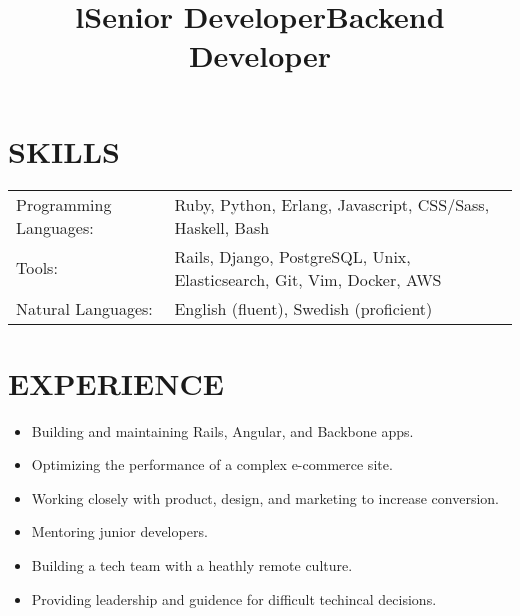 \documentclass[line]{res}
\title{l}\dates{r}\\
\begin{document}
\begin{resume}

\section{SKILLS}
\begin{tabular}{ l l }
Programming Languages: &
Ruby,
Python,
Erlang,
Javascript,
CSS/Sass,
Haskell,
Bash\\

Tools: &
Rails,
Django,
PostgreSQL,
Unix,
Elasticsearch,
Git,
Vim,
Docker,
AWS\\

Natural Languages: &
English (fluent),
Swedish (proficient)
\end{tabular}

\section {EXPERIENCE}
\vspace {2 pt}

\title{Senior Developer}
\begin{position}
\noindent
\vspace {-10 pt}
\begin{itemize}

\item Building and maintaining Rails, Angular, and Backbone apps.
\item Optimizing the performance of a complex e-commerce site.
\item Working closely with product, design, and marketing to increase conversion.
\item Mentoring junior developers.
\item Building a tech team with a heathly remote culture.
\item Providing leadership and guidence for difficult techincal decisions.

\end{itemize}
\end{position}

\title{Backend Developer}
\begin{position}
\noindent
\vspace {-10 pt}
\begin{itemize}


\end{itemize}
\end{position}
\end{resume}
\end{document}
